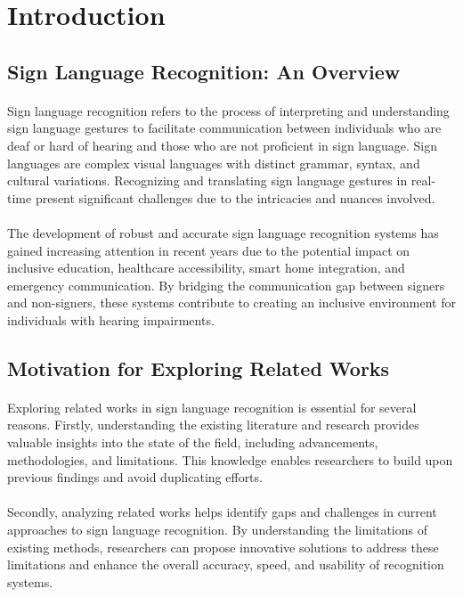 \section{Introduction}
\subsection{Sign Language Recognition: An Overview}
\paragraph{}
Sign language recognition refers to the process of interpreting and understanding sign language gestures to facilitate communication between individuals who are deaf or hard of hearing and those who are not proficient in sign language. Sign languages are complex visual languages with distinct grammar, syntax, and cultural variations. Recognizing and translating sign language gestures in real-time present significant challenges due to the intricacies and nuances involved.
\paragraph{}
The development of robust and accurate sign language recognition systems has gained increasing attention in recent years due to the potential impact on inclusive education, healthcare accessibility, smart home integration, and emergency communication. By bridging the communication gap between signers and non-signers, these systems contribute to creating an inclusive environment for individuals with hearing impairments.
\subsection{Motivation for Exploring Related Works}
\paragraph{}
Exploring related works in sign language recognition is essential for several reasons. Firstly, understanding the existing literature and research provides valuable insights into the state of the field, including advancements, methodologies, and limitations. This knowledge enables researchers to build upon previous findings and avoid duplicating efforts.
\paragraph{}
Secondly, analyzing related works helps identify gaps and challenges in current approaches to sign language recognition. By understanding the limitations of existing methods, researchers can propose innovative solutions to address these limitations and enhance the overall accuracy, speed, and usability of recognition systems.

